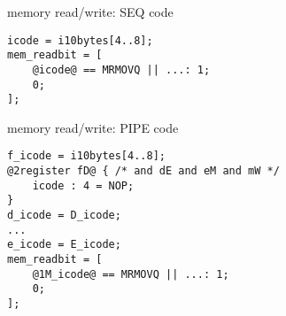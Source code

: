 \begin{frame}[fragile,label=readWriteLogicSeq]{memory read/write: SEQ code}
\begin{lstlisting}
icode = i10bytes[4..8];
mem_readbit = [
    @icode@ == MRMOVQ || ...: 1;
    0;
];
\end{lstlisting}
\end{frame}

\begin{frame}[fragile,label=readWriteLogicPipe]{memory read/write: PIPE code}
\begin{lstlisting}
f_icode = i10bytes[4..8];
@2register fD@ { /* and dE and eM and mW */
    icode : 4 = NOP;
}
d_icode = D_icode;
...
e_icode = E_icode;
mem_readbit = [
    @1M_icode@ == MRMOVQ || ...: 1;
    0;
];
\end{lstlisting}
\end{frame}


